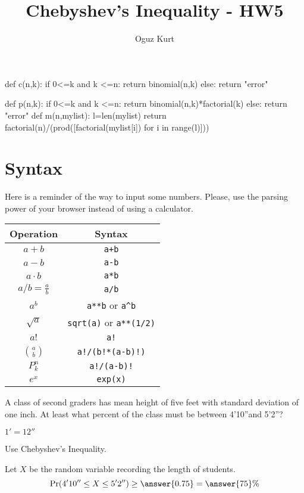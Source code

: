 \documentclass{ximera}
\title{Chebyshev's Inequality - HW5}
\author{Oguz Kurt}
\begin{document}
\begin{abstract}
\empty
\end{abstract}
\maketitle

\begin{sagesilent}
def c(n,k):
    if 0<=k and k <=n:
        return binomial(n,k)
    else:
        return "error"

def p(n,k):
    if 0<=k and k <=n:
        return binomial(n,k)*factorial(k)
    else:
        return "error"
def m(n,mylist):
    l=len(mylist)
    return factorial(n)/(prod([factorial(mylist[i]) for i in range(l)]))
\end{sagesilent}

\section*{Syntax}
Here is a reminder of the way to input some numbers. Please, use the parsing power of your browser instead of using a calculator.

\hspace{0.5cm}


\begin{tabular}{c|c}
Operation & Syntax  
\\
\hline
$a+b$ & {\color{red} \verb!a+b!} 
\\
\hline
$a- b$ & {\color{red} \verb!a-b!} 
\\
\hline
$a\cdot b$ & {\color{red} \verb!a*b! } 
\\
\hline
$a/b=\frac{a}{b}$ & {\color{red} \verb!a/b!}
\\
\hline
$a^b$ & {\color{red} \verb|a**b| or \verb|a^b|} 
\\
\hline
$\sqrt{a}$ & {\color{red} \verb|sqrt(a)| or \verb|a**(1/2)|} 
\\
\hline
$a!$ & {\color{red} \verb|a!|} 
\\
\hline
$\binom{a}{b}$ & {\color{red} \verb|a!/(b!*(a-b)!)|}
\\
\hline
$P_k^n$ & {\color{red} \verb|a!/(a-b)!|}
\\
\hline
$e^x$ & {\color{red} \verb|exp(x)|}
\\
\end{tabular}

\hspace{1cm}

\begin{problem}
A class of second graders has mean height of five feet with standard deviation of one inch. At least what percent of the class must be between 4'10''and 5'2''? 
\begin{hint}
\item $1'=12''$
\item Use Chebyshev's Inequality.
\end{hint}
\begin{prompt}%
Let $X$ be the random variable recording the length of students. $$\Pr(4'10''\leq X \leq 5'2'')\geq\answer{0.75}=\answer{75}\%$$
\end{prompt}
\end{problem}
\end{document}
